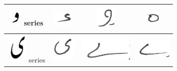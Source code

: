 \begin{table}[h]
\begin{tabular}{@{}cccc@{}}
\hline
\includegraphics[scale=0.15]{wao_orig} series & \includegraphics[scale=0.15]{capture} & \includegraphics[scale=0.15]{wao}  & 
\includegraphics[scale=0.15]{haaa} \\
\hline
\includegraphics[scale=0.15]{choti_ye_orig} series & \includegraphics[scale=0.15]{choti_yaa2} & \includegraphics[scale=0.15]{Bari_yaa2} & 
\includegraphics[scale=0.15]{bari_yaa} \\

 \end{tabular}
\end{table}


